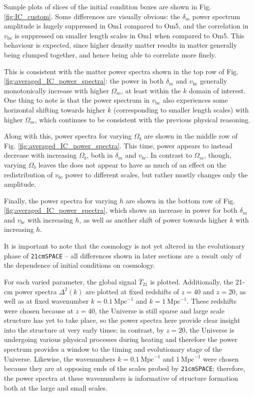 \documentclass[floats,floatfix,showpacs,amssymb,prd,superscriptaddress,nofootinbib]{revtex4-2} %
\newcommand{\code}{\texttt}
\begin{document}
Sample plots of slices of the initial condition boxes are shown in Fig. \ref{fig:IC_custom}. Some differences are visually obvious: the $\delta_m$ power spectrum amplitude is hugely suppressed in Om1 compared to Om5, and the correlation in $v_{\text{bc}}$ is suppressed on smaller length scales in Om1 when compared to Om5. This behaviour is expected, since higher density matter results in matter generally being clumped together, and hence being able to correlate more finely. 

This is consistent with the matter power spectra shown in the top row of Fig. \ref{fig:averaged_IC_power_spectra}: the power in both $\delta_m$ and $v_{\text{bc}}$ generally monotonically increase with higher $\Omega_m$, at least within the $k$ domain of interest. One thing to note is that the power spectrum in $v_{\text{bc}}$ also experiences some horizontal shifting towards higher $k$ (corresponding to smaller length scales) with higher $\Omega_m$, which continues to be consistent with the previous physical reasoning.

Along with this, power spectra for varying $\Omega_b$ are shown in the middle row of Fig. \ref{fig:averaged_IC_power_spectra}. This time, power appears to instead decrease with increasing $\Omega_b$, both in $\delta_m$ and $v_{bc}$. In contrast to $\Omega_m$, though, varying $\Omega_b$ leaves the  does not appear to have as much of an effect on the redistribution of $v_{bc}$ power to different scales, but rather mostly changes only the amplitude.

Finally, the power spectra for varying $h$ are shown in the bottom row of Fig. \ref{fig:averaged_IC_power_spectra}, which shows an increase in power for both $\delta_m$ and $v_{bc}$ with increasing $h$, as well as another shift of power towards higher $k$ with increasing $h$.

It is important to note that the cosmology is not yet altered in the evolutionary phase of \code{21cmSPACE} -- all differences shown in later sections are a result only of the dependence of initial conditions on cosmology. 

For each varied parameter, the global signal $\overline{T}_{21}$ is plotted. Additionally, the 21-cm power spectra $\Delta^2(k)$ are plotted at fixed redshifts of $z = 40$ and $z = 20$, as well as at fixed wavenumber $k = 0.1 ~\text{Mpc}^{-1}$ and $k = 1 ~\text{Mpc}^{-1}$. These redshifts were chosen because at $z = 40$, the Universe is still sparse and large scale structure has yet to take place, so the power spectra here provide clear insight into the structure at very early times; in contrast, by $z = 20$, the Universe is undergoing various physical processes during heating and therefore the power spectrum provides a window to the timing and evolutionary stage of the Universe. Likewise, the wavenumbers $k = 0.1 ~\text{Mpc}^{-1}$ and $1 ~\text{Mpc}^{-1}$ were chosen because they are at opposing ends of the scales probed by \code{21cmSPACE}; therefore, the power spectra at these wavenumbers is informative of structure formation both at the large and small scales.
\end{document}
